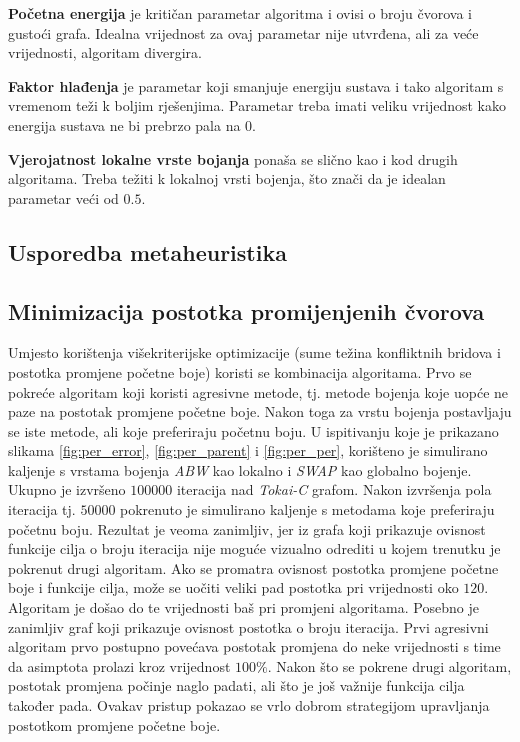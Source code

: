 \documentclass[times, utf8, diplomski, numeric]{fer}
\begin{document}
\textbf{Početna energija} je kritičan parametar algoritma i ovisi o broju čvorova i gustoći grafa. Idealna vrijednost za ovaj parametar nije utvrđena, ali za veće vrijednosti, algoritam divergira.

\textbf{Faktor hlađenja} je parametar koji smanjuje energiju sustava i tako algoritam s vremenom teži k boljim rješenjima. Parametar treba imati veliku vrijednost kako energija sustava ne bi prebrzo pala na $0$.

\textbf{Vjerojatnost lokalne vrste bojanja} ponaša se slično kao i kod drugih algoritama. Treba težiti k lokalnoj vrsti bojenja, što znači da je idealan parametar veći od $0.5$.

\subsection{Usporedba metaheuristika}

\subsection{Minimizacija postotka promijenjenih čvorova}

Umjesto korištenja višekriterijske optimizacije (sume težina konfliktnih bridova i postotka promjene početne boje) koristi se kombinacija algoritama. Prvo se pokreće algoritam koji koristi agresivne metode, tj. metode bojenja koje uopće ne paze na postotak promjene početne boje. Nakon toga za vrstu bojenja postavljaju se iste metode, ali koje preferiraju početnu boju. U ispitivanju koje je prikazano slikama \ref{fig:per_error}, \ref{fig:per_parent} i \ref{fig:per_per}, korišteno je simulirano kaljenje s vrstama bojenja \emph{ABW} kao lokalno i \emph{SWAP} kao globalno bojenje. Ukupno je izvršeno $100000$ iteracija nad \emph{Tokai-C} grafom. Nakon izvršenja pola iteracija tj. $50000$ pokrenuto je simulirano kaljenje s metodama koje preferiraju početnu boju. Rezultat je veoma zanimljiv, jer iz grafa koji prikazuje ovisnost funkcije cilja o broju iteracija nije moguće vizualno odrediti u kojem trenutku je pokrenut drugi algoritam. Ako se promatra ovisnost postotka promjene početne boje i funkcije cilja, može se uočiti veliki pad postotka pri vrijednosti oko $120$. Algoritam je došao do te vrijednosti baš pri promjeni algoritama. Posebno je zanimljiv graf koji prikazuje ovisnost postotka o broju iteracija. Prvi agresivni algoritam prvo postupno povećava postotak promjena do neke vrijednosti s time da asimptota prolazi kroz vrijednost $100\%$. Nakon što se pokrene drugi algoritam, postotak promjena počinje naglo padati, ali što je još važnije funkcija cilja također pada. Ovakav pristup pokazao se vrlo dobrom strategijom upravljanja postotkom promjene početne boje.
\end{document}

